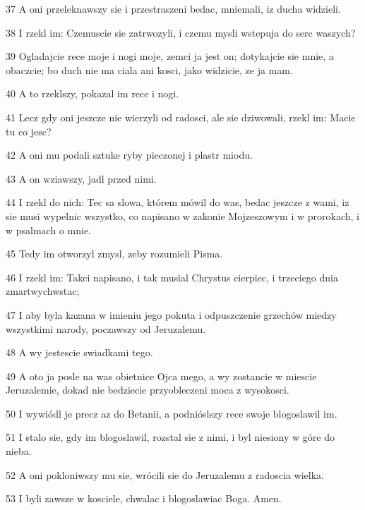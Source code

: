 \par 37 A oni przeleknawszy sie i przestraszeni bedac, mniemali, iz ducha widzieli.
\par 38 I rzekl im: Czemuscie sie zatrwozyli, i czemu mysli wstepuja do serc waszych?
\par 39 Ogladajcie rece moje i nogi moje, zemci ja jest on; dotykajcie sie mnie, a obaczcie; bo duch nie ma ciala ani kosci, jako widzicie, ze ja mam.
\par 40 A to rzeklszy, pokazal im rece i nogi.
\par 41 Lecz gdy oni jeszcze nie wierzyli od radosci, ale sie dziwowali, rzekl im: Macie tu co jesc?
\par 42 A oni mu podali sztuke ryby pieczonej i plastr miodu.
\par 43 A on wziawszy, jadl przed nimi.
\par 44 I rzekl do nich: Tec sa slowa, którem mówil do was, bedac jeszcze z wami, iz sie musi wypelnic wszystko, co napisano w zakonie Mojzeszowym i w prorokach, i w psalmach o mnie.
\par 45 Tedy im otworzyl zmysl, zeby rozumieli Pisma.
\par 46 I rzekl im: Takci napisano, i tak musial Chrystus cierpiec, i trzeciego dnia zmartwychwstac;
\par 47 I aby byla kazana w imieniu jego pokuta i odpuszczenie grzechów miedzy wszystkimi narody, poczawszy od Jeruzalemu.
\par 48 A wy jestescie swiadkami tego.
\par 49 A oto ja posle na was obietnice Ojca mego, a wy zostancie w miescie Jeruzalemie, dokad nie bedziecie przyobleczeni moca z wysokosci.
\par 50 I wywiódl je precz az do Betanii, a podnióslszy rece swoje blogoslawil im.
\par 51 I stalo sie, gdy im blogoslawil, rozstal sie z nimi, i byl niesiony w góre do nieba.
\par 52 A oni pokloniwszy mu sie, wrócili sie do Jeruzalemu z radoscia wielka.
\par 53 I byli zawsze w kosciele, chwalac i blogoslawiac Boga. Amen.


